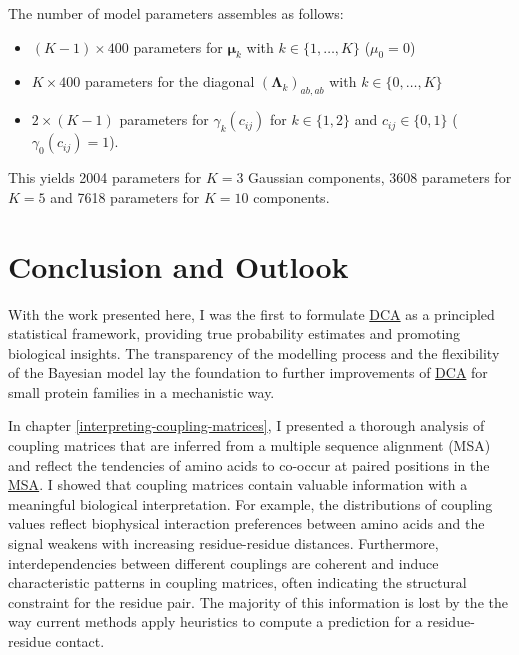 \documentclass[11pt,a4paper,twoside]{book}
\providecommand{\tightlist}{%
  \setlength{\itemsep}{0pt}\setlength{\parskip}{0pt}}
\newcommand{\eq}{\!=\!}
\newcommand{\Lk}{\mathbf{\Lambda}_k}
\newcommand{\muk}{\mathbf{\mu}_k}
\newcommand{\cij}{c_{ij}}
\theoremstyle{definition}
\theoremstyle{definition}
\theoremstyle{remark}
\begin{document}
The number of model parameters assembles as follows:

\begin{itemize}
\tightlist
\item
  \((K-1) \times 400\) parameters for \(\muk\) with
  \(k \in \{1, \ldots, K \}\) (\(\mu_0 = 0\))
\item
  \(K \times 400\) parameters for the diagonal \((\Lk)_{ab, ab}\) with
  \(k \in \{0, \ldots, K\}\)
\item
  \(2 \times (K\!-\!1)\) parameters for \(\gamma_k(\cij)\) for
  \(k \in \{1,2\}\) and \(\cij \in \{0,1\}\) (\(\gamma_0(\cij)\eq1\)).
\end{itemize}

This yields 2004 parameters for \(K\eq3\) Gaussian components, 3608
parameters for \(K\eq5\) and 7618 parameters for \(K\eq10\) components.

\chapter{Conclusion and Outlook}\label{conclusion-and-outlook}

With the work presented here, I was the first to formulate
\protect\hyperlink{abbrev}{DCA} as a principled statistical framework,
providing true probability estimates and promoting biological insights.
The transparency of the modelling process and the flexibility of the
Bayesian model lay the foundation to further improvements of
\protect\hyperlink{abbrev}{DCA} for small protein families in a
mechanistic way.

In chapter \ref{interpreting-coupling-matrices}, I presented a thorough
analysis of coupling matrices that are inferred from a multiple sequence
alignment (MSA) and reflect the tendencies of amino acids to co-occur at
paired positions in the \protect\hyperlink{abbrev}{MSA}. I showed that
coupling matrices contain valuable information with a meaningful
biological interpretation. For example, the distributions of coupling
values reflect biophysical interaction preferences between amino acids
and the signal weakens with increasing residue-residue distances.
Furthermore, interdependencies between different couplings are coherent
and induce characteristic patterns in coupling matrices, often
indicating the structural constraint for the residue pair. The majority
of this information is lost by the the way current methods apply
heuristics to compute a prediction for a residue-residue contact.
\end{document}
